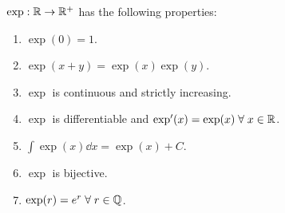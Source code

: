\begin{thm}[]
    $\exp : \mathbb{R} \to \mathbb{R}^{+}$ has the following properties:
    \begin{enumerate}[label=(\alph*)]
        \item $\exp(0) = 1$.
        \item $\exp(x + y) = \exp(x) \exp(y)$.
        \item $\exp$ is continuous and strictly increasing.
        \item $\exp$ is differentiable and $\exp'(x) = \exp(x) \;\forall\; x \in \mathbb{R}$.
        \item $\int \exp(x) \dd x = \exp(x) + C.$
        \item $\exp$ is bijective.
        \item $\exp(r) = e^{r} \;\forall\; r \in \mathbb{Q}$.
    \end{enumerate}
\end{thm}
